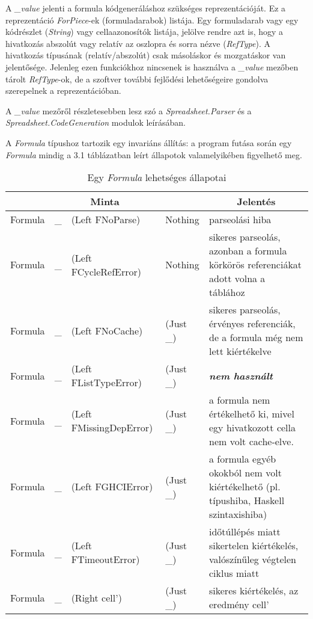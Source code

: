 A \textit{\_value} jelenti a formula kódgeneráláshoz szükséges reprezentációját.  Ez a reprezentáció \textit{ForPiece}-ek (formuladarabok) listája. Egy formuladarab vagy egy kódrészlet (\textit{String}) vagy cellaazonosítók listája, jelölve rendre azt is, hogy a hivatkozás abszolút vagy relatív az oszlopra és sorra nézve (\textit{RefType}). A hivatkozás típusának (relatív/abszolút) csak másoláskor és mozgatáskor van jelentősége. Jelenleg ezen funkciókhoz nincsenek is használva a \textit{\_value} mezőben tárolt \textit{RefType}-ok, de a szoftver további fejlődési lehetőségeire gondolva szerepelnek a reprezentációban.

A \textit{\_value} mezőről részletesebben lesz szó a \textit{Spreadsheet.Parser} és a \textit{Spreadsheet.CodeGeneration} modulok leírásában. 

A \textit{Formula} típushoz tartozik egy invariáns állítás: a program futása során egy \textit{Formula} mindig a 3.1 táblázatban leírt állapotok valamelyikében figyelhető meg.

\begin{table}
	\centering
	\begin{tabularx}{\textwidth}{ |l l l l| X |}
		\hline
		\multicolumn{4}{|c|}{Minta} & \multicolumn{1}{|c|}{Jelentés} \\
		\hline\hline
		Formula & \_ & (Left FNoParse) & Nothing & parseolási hiba \\
		\hline
		Formula & \_ & (Left FCycleRefError) & Nothing & sikeres parseolás, azonban a formula körkörös referenciákat adott volna a táblához \\
		\hline
		Formula & \_ & (Left FNoCache) & (Just \_) & sikeres parseolás, érvényes referenciák, de a formula még nem lett kiértékelve \\
		\hline
		Formula & \_ & (Left FListTypeError) & (Just \_) & \textbf{\textit{nem használt}} \\
		\hline
		Formula & \_ & (Left FMissingDepError) & (Just \_) & a formula nem értékelhető ki, mivel egy hivatkozott cella nem volt cache-elve. \\
		\hline
		Formula & \_ & (Left FGHCIError) & (Just \_) & a formula egyéb okokból nem volt kiértékelhető (pl. típushiba, Haskell szintaxishiba) \\
		\hline
		Formula & \_ & (Left FTimeoutError) & (Just \_) & időtúllépés miatt sikertelen kiértékelés, valószínűleg végtelen ciklus miatt \\
		\hline
		Formula & \_ & (Right cell') & (Just \_) & sikeres kiértékelés, az eredmény cell' \\
		\hline 
	\end{tabularx}
	\caption[Egy \textit{Formula} lehetséges állapotai]{Egy \textit{Formula} lehetséges állapotai}
	\label{tab:formula}
\end{table}

